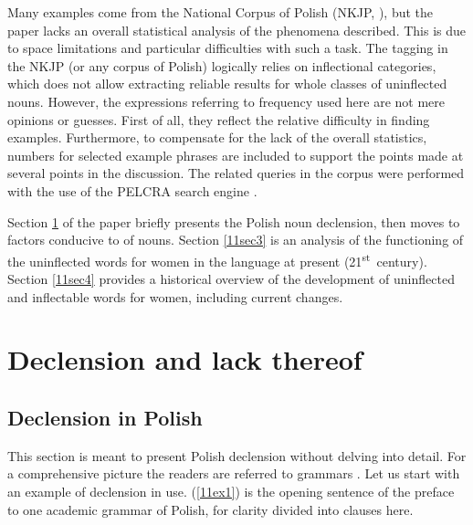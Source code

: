 \documentclass[output=paper,colorlinks,citecolor=brown]{langscibook}
\begin{document}
{\sloppy Many examples come from the National Corpus of Polish (NKJP, \citealt{przepiorkowskibankogorskilewandowskatomaszczyk2012}), but the paper lacks an overall statistical analysis of the phenomena described. This is due to space limitations and particular difficulties with such a task. The tagging in the NKJP (or any corpus of Polish) logically relies on inflectional categories, which does not allow extracting reliable results for whole classes of uninflected nouns. However, the expressions referring to frequency used here are not mere opinions or guesses. First of all, they reflect the relative difficulty in finding examples. Furthermore, to compensate for the lack of the overall statistics, numbers for selected example phrases are included to support the points made at several points in the discussion. The related queries in the corpus were performed with the use of the PELCRA search engine \citep{pezik2012}.\par}

Section \ref{11sec2} of the paper briefly presents the Polish noun declension, then moves to factors conducive to  of nouns. Section \ref{11sec3} is an analysis of the functioning of the uninflected words for women in the language at present (21\textsuperscript{st}~century). Section \ref{11sec4} provides a historical overview of the development of uninflected and inflectable words for women, including current changes.

\section{Declension and lack thereof} \label{11sec2}

\subsection{Declension in Polish} \label{11sec2.1}

This section is meant to present Polish declension without delving into detail. For a comprehensive picture the readers are referred to grammars \citep{zagorska-brooks1975, laskowski1979, bielec1998, swan2002}. Let us start with an example of declension in use. (\ref{11ex1}) is the opening sentence of the preface to one academic grammar of Polish, for clarity divided into clauses here.
\end{document}
